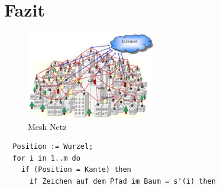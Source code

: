 \section{Fazit}

\begin{figure} [htbp]
	\centering
		\includegraphics[width=0.50\textwidth]{WMN}
	\caption{Mesh Netz}
	\label{fig:WMN}
\end{figure}

\begin{verbatim}
  Position := Wurzel;  
  for i in 1..m do
    if (Position = Kante) then	
      if Zeichen auf dem Pfad im Baum = s'(i) then   
\end{verbatim}